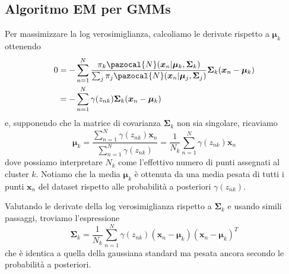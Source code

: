 \documentclass{report}
\begin{document}
\subsection{Algoritmo EM per GMMs}

Per massimizzare la log verosimiglianza, calcoliamo le derivate rispetto a $\bm\mu_k$ ottenendo
\begin{equation}
\begin{aligned}
0 &= -\sum_{n=1}^N\frac{\pi_k\pazocal{N}(\bm{x}_n|\bm\mu_k, \bm\Sigma_k)}{\sum_j \pi_j\pazocal{N}(\bm{x}_n|\bm\mu_j, \bm\Sigma_j)}\bm\Sigma_k(\bm{x}_n - \bm\mu_k)\\
&= -\sum_{n=1}^N\gamma(z_{nk})\bm\Sigma_k(\bm{x}_n - \bm\mu_k)
\end{aligned}
\end{equation}
e, supponendo che la matrice di covarianza $\bm\Sigma_k$ non sia singolare, ricaviamo
\begin{equation}
\bm\mu_k = \frac{\sum_{n=1}^N\gamma(z_{nk})\bm{x}_n}{\sum_{n=1}^N\gamma(z_{nk})} = \frac{1}{N_k}\sum_{n=1}^N\gamma(z_{nk})\bm{x}_n
\end{equation}
dove possiamo interpretare $N_k$ come l'effettivo numero di punti assegnati al cluster $k$. Notiamo che la media $\bm\mu_k$ è ottenuta da una media pesata di tutti i punti $\bm{x}_n$ del dataset rispetto alle probabilità a posteriori $\gamma(z_{nk})$.

Valutando le derivate della log verosimiglianza rispetto a $\bm\Sigma_k$ e usando simili passaggi, troviamo l'espressione
\begin{equation}
\bm\Sigma_k = \frac{1}{N_k}\sum_{n=1}^N\gamma(z_{nk})(\bm{x}_n - \bm\mu_k)(\bm{x}_n - \bm\mu_k)^T
\end{equation}
che è identica a quella della gaussiana standard ma pesata ancora secondo le probabilità a posteriori.
\end{document}
